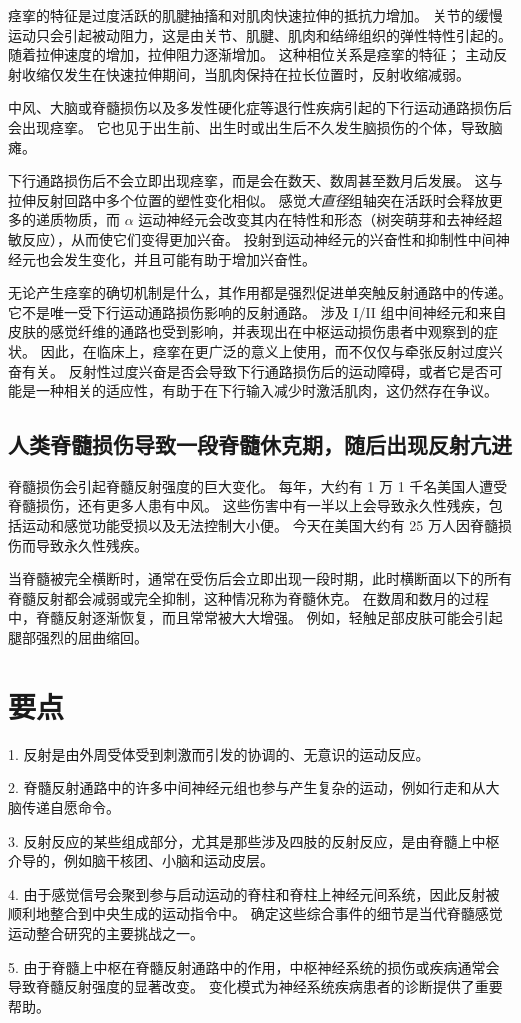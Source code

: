 痉挛的特征是过度活跃的肌腱抽搐和对肌肉快速拉伸的抵抗力增加。
关节的缓慢运动只会引起被动阻力，这是由关节、肌腱、肌肉和结缔组织的弹性特性引起的。
随着拉伸速度的增加，拉伸阻力逐渐增加。
这种相位关系是痉挛的特征；
主动反射收缩仅发生在快速拉伸期间，当肌肉保持在拉长位置时，反射收缩减弱。


中风、大脑或脊髓损伤以及多发性硬化症等退行性疾病引起的下行运动通路损伤后会出现痉挛。
它也见于出生前、出生时或出生后不久发生脑损伤的个体，导致脑瘫。


下行通路损伤后不会立即出现痉挛，而是会在数天、数周甚至数月后发展。
这与拉伸反射回路中多个位置的塑性变化相似。
感觉\textit{大直径}组轴突在活跃时会释放更多的递质物质，而 $ \alpha $ 运动神经元会改变其内在特性和形态（树突萌芽和去神经超敏反应），从而使它们变得更加兴奋。
投射到运动神经元的兴奋性和抑制性中间神经元也会发生变化，并且可能有助于增加兴奋性。


无论产生痉挛的确切机制是什么，其作用都是强烈促进单突触反射通路中的传递。
它不是唯一受下行运动通路损伤影响的反射通路。
涉及 I/II 组中间神经元和来自皮肤的感觉纤维的通路也受到影响，并表现出在中枢运动损伤患者中观察到的症状。
因此，在临床上，痉挛在更广泛的意义上使用，而不仅仅与牵张反射过度兴奋有关。
反射性过度兴奋是否会导致下行通路损伤后的运动障碍，或者它是否可能是一种相关的适应性，有助于在下行输入减少时激活肌肉，这仍然存在争议。



\subsection{人类脊髓损伤导致一段脊髓休克期，随后出现反射亢进}

脊髓损伤会引起脊髓反射强度的巨大变化。
每年，大约有 1 万 1 千名美国人遭受脊髓损伤，还有更多人患有中风。
这些伤害中有一半以上会导致永久性残疾，包括运动和感觉功能受损以及无法控制大小便。
今天在美国大约有 25 万人因脊髓损伤而导致永久性残疾。


当脊髓被完全横断时，通常在受伤后会立即出现一段时期，此时横断面以下的所有脊髓反射都会减弱或完全抑制，这种情况称为脊髓休克。
在数周和数月的过程中，脊髓反射逐渐恢复，而且常常被大大增强。
例如，轻触足部皮肤可能会引起腿部强烈的屈曲缩回。



\section{要点}

1. 反射是由外周受体受到刺激而引发的协调的、无意识的运动反应。


2. 脊髓反射通路中的许多中间神经元组也参与产生复杂的运动，例如行走和从大脑传递自愿命令。


3. 反射反应的某些组成部分，尤其是那些涉及四肢的反射反应，是由脊髓上中枢介导的，例如脑干核团、小脑和运动皮层。


4. 由于感觉信号会聚到参与启动运动的脊柱和脊柱上神经元间系统，因此反射被顺利地整合到中央生成的运动指令中。
确定这些综合事件的细节是当代脊髓感觉运动整合研究的主要挑战之一。


5. 由于脊髓上中枢在脊髓反射通路中的作用，中枢神经系统的损伤或疾病通常会导致脊髓反射强度的显著改变。
变化模式为神经系统疾病患者的诊断提供了重要帮助。
